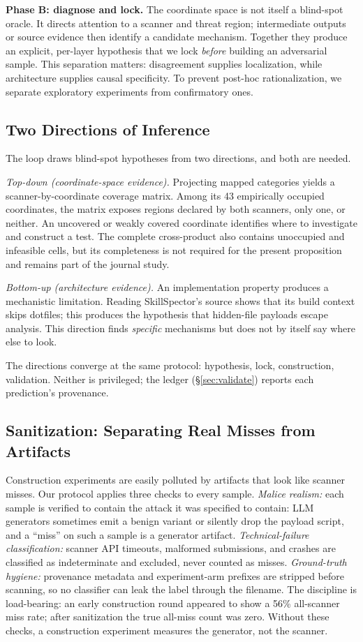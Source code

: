 \documentclass[sigconf,nonacm]{acmart}
\begin{document}
\noindent\textbf{Phase B: diagnose and lock.} The coordinate space is not itself a blind-spot oracle. It directs attention to a scanner and threat region; intermediate outputs or source evidence then identify a candidate mechanism. Together they produce an explicit, per-layer hypothesis that we lock \emph{before} building an adversarial sample. This separation matters: disagreement supplies localization, while architecture supplies causal specificity. To prevent post-hoc rationalization, we separate exploratory experiments from confirmatory ones.

\subsection{Two Directions of Inference}
The loop draws blind-spot hypotheses from two directions, and both are needed.

\emph{Top-down (coordinate-space evidence).} Projecting mapped categories yields a scanner-by-coordinate coverage matrix. Among its 43 empirically occupied coordinates, the matrix exposes regions declared by both scanners, only one, or neither. An uncovered or weakly covered coordinate identifies where to investigate and construct a test. The complete cross-product also contains unoccupied and infeasible cells, but its completeness is not required for the present proposition and remains part of the journal study.

\emph{Bottom-up (architecture evidence).} An implementation property produces a mechanistic limitation. Reading SkillSpector's source shows that its build context skips dotfiles; this produces the hypothesis that hidden-file payloads escape analysis. This direction finds \emph{specific} mechanisms but does not by itself say where else to look.

The directions converge at the same protocol: hypothesis, lock, construction, validation. Neither is privileged; the ledger (\S\ref{sec:validate}) reports each prediction's provenance.

\subsection{Sanitization: Separating Real Misses from Artifacts}
Construction experiments are easily polluted by artifacts that look like scanner misses. Our protocol applies three checks to every sample. \emph{Malice realism:} each sample is verified to contain the attack it was specified to contain: LLM generators sometimes emit a benign variant or silently drop the payload script, and a ``miss'' on such a sample is a generator artifact. \emph{Technical-failure classification:} scanner API timeouts, malformed submissions, and crashes are classified as indeterminate and excluded, never counted as misses. \emph{Ground-truth hygiene:} provenance metadata and experiment-arm prefixes are stripped before scanning, so no classifier can leak the label through the filename. The discipline is load-bearing: an early construction round appeared to show a 56\% all-scanner miss rate; after sanitization the true all-miss count was zero. Without these checks, a construction experiment measures the generator, not the scanner.
\end{document}

